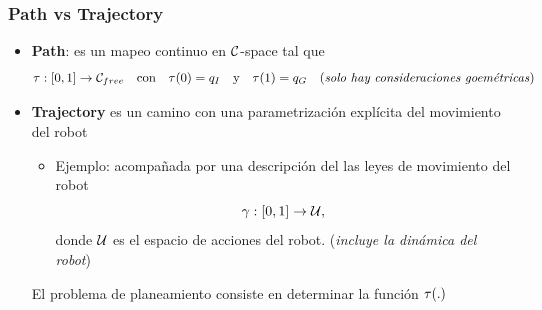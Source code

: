 \begin{frame}
    \frametitle{Path vs Trajectory}
    
    \begin{itemize}
    \item {\bf Path}: es un mapeo continuo en $\mathcal{C}$-space tal que
        \begin{equation*}
            \tau : [0,1] \rightarrow \mathcal{C}_{free} \quad \text{con} \quad \tau(0) = q_{I} \quad \text{y} \quad  \tau(1) = q_{G} \quad \text{(\emph{solo hay consideraciones goemétricas})}
        \end{equation*} 
    \item {\bf Trajectory} es un camino con una parametrización explícita del movimiento del robot
    \begin{itemize}
        \item Ejemplo: acompañada por una descripción del las leyes de movimiento del robot
            \begin{equation*}
                \gamma : [0, 1] \rightarrow \mathcal{U},
            \end{equation*}
            donde $\mathcal{U}$ es el espacio de acciones del robot. (\emph{incluye la dinámica del robot})
        \end{itemize}
        \vspace{3em}
        \begin{center}
            \alert{El problema de planeamiento consiste en determinar la función $\tau(.)$}  
        \end{center}
    \end{itemize}
\end{frame}

